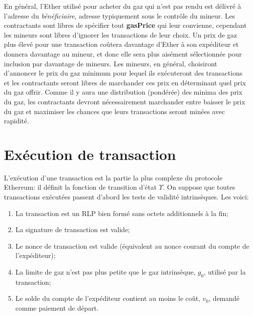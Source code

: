 \documentclass[9pt,oneside]{amsart}
\begin{document}
\begin{multicols}{2}
En général, l'Ether utilisé pour acheter du gaz qui n'est pas rendu est délivré à l'adresse du \textit{bénéficiaire}, adresse typiquement sous le contrôle du mineur. Les contractants sont libres de spécifier tout \textbf{gasPrice} qui leur convienne, cependant les mineurs sont libres d'ignorer les transactions de leur choix. Un prix de gaz plus élevé pour une transaction coûtera davantage d'Ether à son expéditeur et donnera davantage au mineur, et donc elle sera plus aisément sélectionnée pour inclusion par davantage de mineurs. Les mineurs, en général, choisiront d'annoncer le prix du gaz minimum pour lequel ils exécuteront des transactions et les contractants seront libres de marchander ces prix en déterminant quel prix du gaz offrir. Comme il y aura une distribution (pondérée) des minima des prix du gaz, les contractants devront nécessairement marchander entre baisser le prix du gaz et maximiser les chances que leurs transactions seront minées avec rapidité.


\section{Exécution de transaction} \label{ch:transactions}

L'exécution d'une transaction est la partie la plus complexe du protocole Ethereum: il définit la fonction de transition d'état $\Upsilon$. On suppose que toutes transactions exécutées passent d'abord les tests de validité intrinsèques. Les voici:

\begin{enumerate}
\item La transaction est un RLP bien formé sans octets additionnels à la fin;
\item La signature de transaction est valide;
\item Le nonce de transaction est valide (équivalent au nonce courant du compte de l'expéditeur);
\item La limite de gaz n'est pas plus petite que le gaz intrinsèque, $g_0$, utilisé par la transaction;
\item Le solde du compte de l'expéditeur contient au moins le coût, $v_0$, demandé comme paiement de départ.
\end{enumerate}


\end{multicols}
\end{document}
